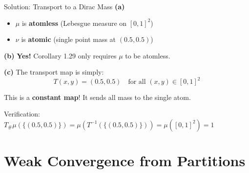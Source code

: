 \documentclass[aspectratio=169]{beamer}
\begin{document}
\begin{frame}{Solution: Transport to a Dirac Mass}
\textbf{(a)}
\begin{itemize}
    \item $\mu$ is \textbf{atomless} (Lebesgue measure on $[0,1]^2$)
    \item $\nu$ is \textbf{atomic} (single point mass at $(0.5, 0.5)$)
\end{itemize}

\vspace{0.3cm}
\textbf{(b)} \textbf{Yes!} Corollary 1.29 only requires $\mu$ to be atomless.

\vspace{0.3cm}
\textbf{(c)} The transport map is simply:
\[
\boxed{T(x, y) = (0.5, 0.5) \quad \text{for all } (x, y) \in [0,1]^2}
\]

This is a \textbf{constant map}! It sends all mass to the single atom.

\begin{center}
\end{center}

Verification: $T_\# \mu(\{(0.5, 0.5)\}) = \mu(T^{-1}(\{(0.5, 0.5)\})) = \mu([0,1]^2) = 1$ \checkmark
\end{frame}

\section{Weak Convergence from Partitions}
\end{document}
